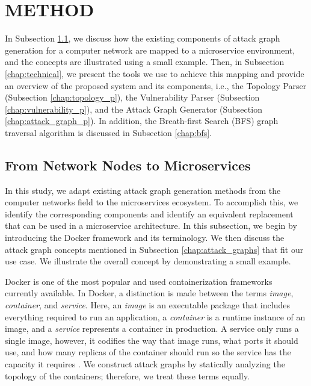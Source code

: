 \section{METHOD}
\label{chap:method}
In Subsection \ref{chap:mapping}, we discuss how the existing components of attack graph generation for a computer network are mapped to a microservice environment, and the concepts are illustrated using a small example. Then, in Subsection \ref{chap:technical}, we present the tools we use to achieve this mapping and provide an overview of the proposed system and its components, i.e., the Topology Parser (Subsection \ref{chap:topology_p}), the Vulnerability Parser (Subsection \ref{chap:vulnerability_p}), and the Attack Graph Generator (Subsection \ref{chap:attack_graph_p}). In addition, the Breath-first Search (BFS) graph traversal algorithm is discussed in Subsection \ref{chap:bfs}. 


\subsection{From Network Nodes to Microservices}
\label{chap:mapping}
In this study, we adapt existing attack graph generation methods from the computer networks field to the microservices ecosystem. To accomplish this, we identify the corresponding components and identify an equivalent replacement that can be used in a microservice architecture. In this subsection, we begin by introducing the Docker framework and its terminology. We then discuss the attack graph concepts mentioned in Subsection \ref{chap:attack_graphs} that fit our use case. We illustrate the overall concept by demonstrating a small example.

Docker is one of the most popular and used containerization frameworks currently available. In Docker, a distinction is made between the terms \textit{image}, \textit{container}, and \textit{service}. Here, an \textit{image} is an executable package that includes everything required to run an application, a \textit{container} is a runtime instance of an image, and a \textit{service} represents a container in production. A service only runs a single image, however, it codifies the way that image runs, what ports it should use, and how many replicas of the container should run so the service has the capacity it requires \cite{merkel2014docker}. We construct attack graphs by statically analyzing the topology of the containers; therefore, we treat these terms equally.  

